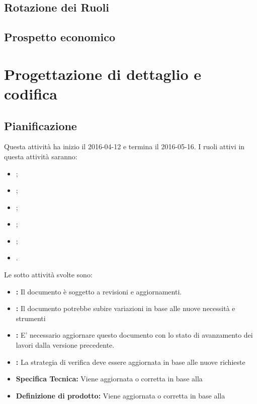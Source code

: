 \documentclass[12pt,a4paper]{article}
\begin{document}
\subsection{Rotazione dei Ruoli}

\subsection{Prospetto economico}

\newpage
\section{Progettazione di dettaglio e codifica} %

\subsection{Pianificazione}

Questa attività ha inizio il 2016-04-12 e termina il 2016-05-16. I ruoli attivi in questa attività saranno:
\begin{itemize}
	\item \PM;
	\item \AM;
	\item \AN;
    \item \PR;
    \item \PG;
    \item \VR.
\end{itemize}
Le sotto attività svolte sono:
\begin{itemize}
\item \textbf{\AdR:} 
Il documento è soggetto a revisioni e aggiornamenti.
\item \textbf{\NdP:}
Il documento potrebbe subire variazioni in base
alle nuove necessità e strumenti
\item \textbf{\PdP:}
E' necessario aggiornare questo documento con lo stato di avanzamento
dei lavori dalla versione precedente.
\item \textbf{\PdQ:}
La strategia di verifica deve essere aggiornata in base 
alle nuove richieste
\item \textbf{Specifica Tecnica:}
Viene aggiornata o corretta in base alla \RP
\item \textbf{Definizione di prodotto:}
Viene aggiornata o corretta in base alla \RP
\end{itemize}
\end{document}
